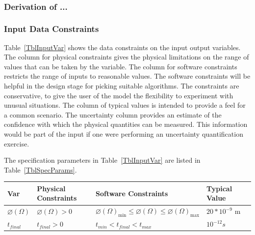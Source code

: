 \documentclass[12pt]{article}
\begin{document}


~\newline

\subsubsection*{Derivation of ...}





\subsubsection{Input Data Constraints} \label{sec_DataConstraints}    

Table~\ref{TblInputVar} shows the data constraints on the input output
variables.  The column for physical constraints gives the physical limitations
on the range of values that can be taken by the variable.  The column for
software constraints restricts the range of inputs to reasonable values.  The
software constraints will be helpful in the design stage for picking suitable
algorithms.  The constraints are conservative, to give the user of the model the
flexibility to experiment with unusual situations.  The column of typical values
is intended to provide a feel for a common scenario.  The uncertainty column
provides an estimate of the confidence with which the physical quantities can be
measured.  This information would be part of the input if one were performing an
uncertainty quantification exercise.

The specification parameters in Table~\ref{TblInputVar} are listed in
Table~\ref{TblSpecParams}.

\begin{table}[!h]
  \caption{Input Variables} \label{TblInputVar}
  \renewcommand{\arraystretch}{1.2}
\noindent \begin{longtable*}{l l l l c} 
  \toprule
  \textbf{Var} & \textbf{Physical Constraints} & \textbf{Software Constraints} &
                             \textbf{Typical Value} \\
  \midrule 
  $\varnothing(\Omega)$ & $\varnothing(\Omega) > 0$ & $\varnothing(\Omega)_{\text{min}} \leq \varnothing(\Omega) \leq \varnothing(\Omega)_{\text{max}}$ & $20*10^{-9}$ \si[per-mode=symbol] {\metre} 
  \\
  $t_{final}$ & $t_{final}>0$ &   $t_{min} < t_{final} < t_{max}$ & $10^{-12} s$\\
  \bottomrule
\end{longtable*}
\end{table}
\end{document}
